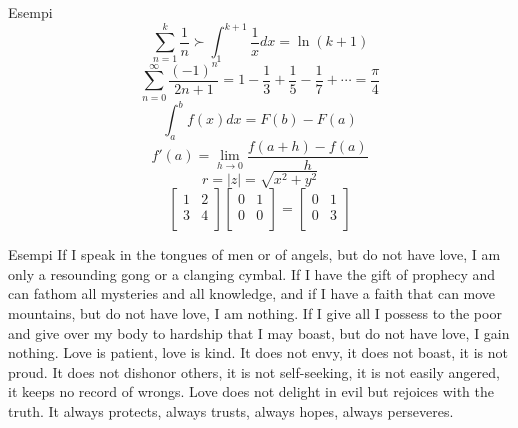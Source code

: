 \documentclass{beamer}
\begin{document}
\begin{frame}{Esempi}
\begin{equation}
\sum_{n=1}^k \frac{1}{n} ≻ \int_1^{k+1} \frac{1}{x} dx = \ln(k+1)
\end{equation}
\begin{equation}
\sum_{n = 0}^\infty \frac{(-1)^{n}}{2n+1} = 1 - \frac{1}{3} + \frac{1}{5} - \frac{1}{7} + \cdots = \frac{\pi}{4}
\end{equation}
\begin{equation}
\int_a^b \! f(x) dx = F(b) - F(a)
\end{equation}
\begin{equation}
f'(a)=\lim_{h\to 0}\frac{f(a+h)-f(a)}{h}
\end{equation}
\begin{equation}
\textstyle r=|z|=\sqrt{x^2+y^2}
\end{equation}
\begin{equation}
\begin{bmatrix} 1 & 2\\ 3 & 4\\ \end{bmatrix} \begin{bmatrix} 0 & 1\\ 0 & 0\\ \end{bmatrix}= \begin{bmatrix} 0 & 1\\ 0 & 3\\ \end{bmatrix}
\end{equation}
\end{frame}

\begin{frame}{Esempi}
\shapepar{\heartshape}
If I speak in the tongues of men or of angels, but do not have love, I am only a resounding gong or a clanging cymbal. If I have the gift of prophecy and can fathom all mysteries and all knowledge, and if I have a faith that can move mountains, but do not have love, I am nothing.  If I give all I possess to the poor and give over my body to hardship that I may boast, but do not have love, I gain nothing. Love is patient, love is kind. It does not envy, it does not boast, it is not proud.  It does not dishonor others, it is not self-seeking, it is not easily angered, it keeps no record of wrongs.  Love does not delight in evil but rejoices with the truth. It always protects, always trusts, always hopes, always perseveres.
\end{frame}
\end{document}

